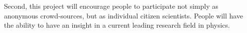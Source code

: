 \documentclass[11pt]{article}
\begin{document}

Second, this project will encourage people to participate not simply as anonymous crowd-sources, but as individual citizen scientists.
People will have the ability to have an insight in a current leading research field in physics.


\newpage


\end{document}
